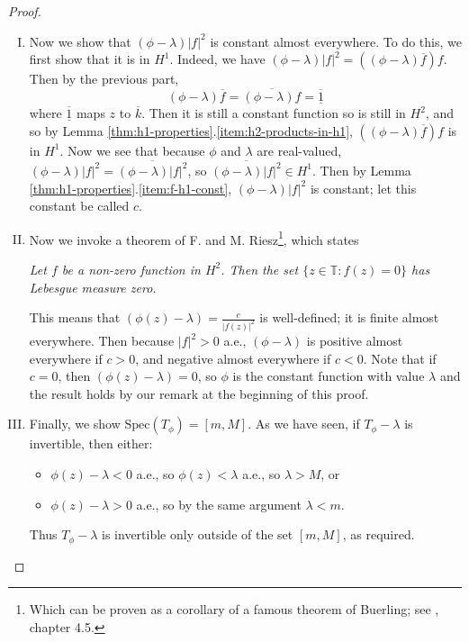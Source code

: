 \documentclass{article}
\newcommand{\Spec}{\text{Spec}}
\begin{document}
\begin{proof}
\begin{enumerate}[I.]
\item Now we show that $(\phi - \lambda)|f|^2$ is constant almost everywhere. To do this, we first show that it is in $H^1$. Indeed, we have
$(\phi - \lambda)|f|^2 = ((\phi - \lambda)\overline{f}) f$. Then by the previous part, $$(\phi - \lambda)\overline{f} = \overline{(\phi - \lambda)f} = \overline{\underline{1}}$$
where $\overline{\underline{1}}$ maps $z$ to $\overline{k}$. Then it is still a constant function so is still in $H^2$, and so by Lemma \ref{thm:h1-properties}.\ref{item:h2-products-in-h1}, $((\phi - \lambda)\overline{f}) f$ is in $H^1$. Now we see that because $\phi$ and $\lambda$ are real-valued, $(\phi - \lambda)|f|^2 = \overline{(\phi - \lambda)|f|^2}$, so $\overline{(\phi - \lambda)|f|^2} \in H^1$. Then by Lemma \ref{thm:h1-properties}.\ref{item:f-h1-const}, $(\phi - \lambda)|f|^2$ is constant; let this constant be called $c$.
\item Now we invoke a theorem of F. and M. Riesz\footnote{Which can be proven as a corollary of a famous theorem of Buerling; see \parencite{arveson2002short}, chapter 4.5.}, which states
\begin{displayquote}
\emph{Let $f$ be a non-zero function in $H^2$. Then the set $\{z \in \mathbb{T} : f(z) = 0\}$ has Lebesgue measure zero.}
\end{displayquote}
This means that $(\phi(z) - \lambda) = \frac{c}{|f(z)|^2}$ is well-defined; it is finite almost everywhere. Then because $|f|^2 > 0$ a.e., $(\phi - \lambda)$ is positive almost everywhere if $c > 0$, and negative almost everywhere if $c < 0$. Note that if $c = 0$, then $(\phi(z) - \lambda) = 0$, so $\phi$ is the 
constant function with value $\lambda$ and the result holds by our remark at the beginning of this proof.
\item Finally, we show $\Spec(T_\phi) = [m, M]$. As we have seen, if $T_\phi - \lambda$ is invertible, then either:
\begin{itemize}
\item $\phi(z) - \lambda < 0$ a.e., so $\phi(z) < \lambda$ a.e., so $\lambda > M$, or
\item $\phi(z) - \lambda > 0$ a.e., so by the same argument $\lambda < m$.
\end{itemize}
Thus $T_\phi - \lambda$ is invertible only outside of the set $[m, M]$, as required.
\end{enumerate}
\end{proof}

\printbibliography
\end{document}
